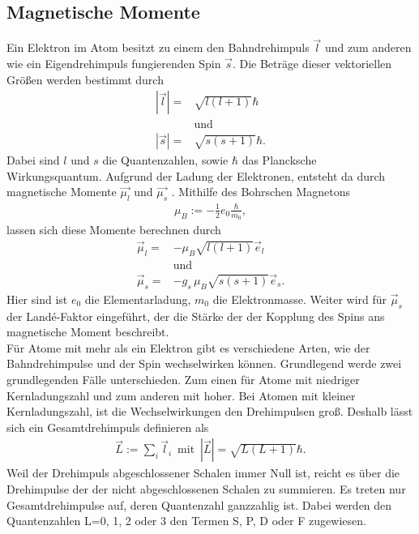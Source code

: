 \subsection{Magnetische Momente}
Ein Elektron im Atom besitzt zu einem den Bahndrehimpuls $\vec{l}$ und zum anderen wie ein Eigendrehimpuls fungierenden Spin $\vec{s}$.
Die Beträge dieser vektoriellen Größen werden bestimmt durch
\begin{align}
	|\vec{l}|=&\sqrt{l(l+1)}\hbar\\
	\nonumber &\text{und}\\
	|\vec{s}|=&\sqrt{s(s+1)}\hbar.
\end{align}
Dabei sind $l$ und $s$ die Quantenzahlen, sowie $\hbar$ das Plancksche Wirkungsquantum.
Aufgrund der Ladung der Elektronen, entsteht da durch magnetische Momente $\vec{\mu_l}$ und $\vec{\mu_s}$ .
Mithilfe des Bohrschen Magnetons 
\begin{align}
	\mu_B:=-\frac{1}{2}e_0 \frac{\hbar}{m_0},
\end{align}
lassen sich diese Momente berechnen durch
\begin{align}
	\vec{\mu}_l=&-\mu_B\sqrt{l(l+1)}\vec{e}_l\\
	\nonumber &\text{und}\\
	\vec{\mu}_s=&-g_s\,\mu_B\sqrt{s(s+1)}\vec{e}_s.
\end{align}
Hier sind ist $e_0$ die Elementarladung, $m_0$ die Elektronmasse.
Weiter wird für $\vec{\mu}_s$ der Landé-Faktor eingeführt, der die Stärke der der Kopplung des Spins ans magnetische Moment beschreibt.\\
Für Atome mit mehr als ein Elektron gibt es verschiedene Arten, wie der Bahndrehimpulse und der Spin wechselwirken können.
Grundlegend werde zwei grundlegenden Fälle unterschieden.
Zum einen für Atome mit niedriger Kernladungszahl und zum anderen mit hoher.
Bei Atomen mit kleiner Kernladungszahl, ist die Wechselwirkungen den Drehimpulsen groß.
Deshalb lässt sich ein Gesamtdrehimpuls definieren als
\begin{align}
	\vec{L}:=\sum_i \vec{l}_i\, \text{ mit }\, |\vec{L}|=\sqrt{L(L+1)}\hbar.
\end{align}
Weil der Drehimpuls abgeschlossener Schalen immer Null ist, reicht es über die Drehimpulse der der nicht abgeschlossenen Schalen zu summieren.
Es treten nur Gesamtdrehimpulse auf, deren Quantenzahl ganzzahlig ist.
Dabei werden den Quantenzahlen L=0, 1, 2 oder 3 den Termen S, P, D oder F zugewiesen.\\
